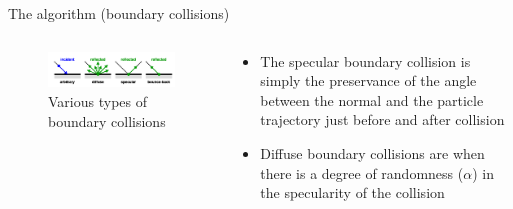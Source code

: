 \documentclass{beamer}
\begin{document}
        \begin{frame}{The algorithm (boundary collisions)}
            \begin{columns}
                \begin{column}{0.5\linewidth}
                    \begin{figure}
                        \centering
                        \includegraphics[width=\linewidth]{Pictures/Literature/Bound_Refl.png}
                        \caption{Various types of boundary collisions}
                        \label{Grid}
                    \end{figure}
                \end{column}
        
                \begin{column}{0.5\linewidth}
                    \begin{itemize}
                        \setlength\itemsep{0.25cm}
                        
                        \item<1->The specular boundary collision is simply the preservance of the angle between the normal and the particle trajectory just before and after collision
                
                        \item<2->Diffuse boundary collisions are when there is a degree of randomness ($\alpha$) in the specularity of the collision
                    \end{itemize}
                \end{column}
            \end{columns}
        \end{frame}
\end{document}
